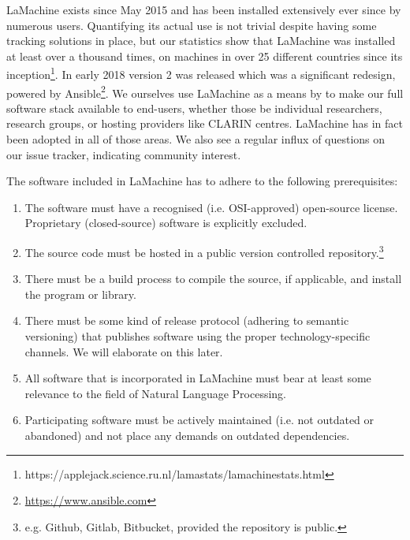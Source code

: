 \documentclass[a4paper,11pt]{article}
\begin{document}
LaMachine exists since May 2015 and has been installed extensively ever since by numerous users. Quantifying its actual
use is not trivial despite having some tracking solutions in place, but our statistics show that LaMachine was installed at least over a thousand times, on
machines in over 25 different countries since its inception\footnote{https://applejack.science.ru.nl/lamastats/lamachinestats.html}. In early 2018 version 2 was released which was a significant redesign, powered
by Ansible\footnote{\url{https://www.ansible.com}}. We ourselves use LaMachine as a means by to make our full software
stack available to end-users, whether those be individual researchers, research groups, or hosting providers like CLARIN
centres. LaMachine has in fact been adopted in all of those areas. We also see a regular influx of questions on our issue tracker, indicating community interest.

The software included in LaMachine has to adhere to the following prerequisites:

\begin{enumerate}

    \item The software must have a recognised (i.e. OSI-approved) open-source license.
        Proprietary (closed-source) software is explicitly excluded.
    \item The source
        code must be hosted in a public version controlled repository.\footnote{e.g. Github, Gitlab, Bitbucket, provided
        the repository is public.}
    \item There must be a build process to compile the source, if applicable, and install the program or library.
    \item There must be some kind of release protocol (adhering to semantic versioning) that publishes software using the proper
technology-specific channels. We will elaborate on this later.
    \item All software that is incorporated in LaMachine must bear at least some relevance to the field of Natural Language Processing.
    \item Participating software must be actively maintained (i.e. not outdated or abandoned) and not place any demands on outdated
        dependencies. %
\end{enumerate}
\end{document}
